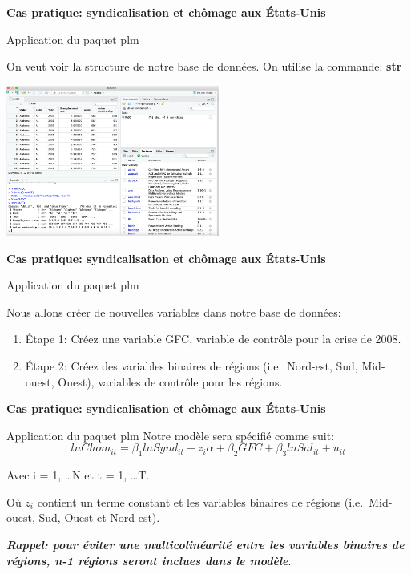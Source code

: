 \documentclass{beamer}
\begin{document}
\begin{frame}{\textbf{Cas pratique: syndicalisation et ch\^omage aux \'Etats-Unis}}
\begin{block}{Application du paquet plm}
\end{block}
On veut voir la structure de notre base de donn\'ees. On utilise la commande: \textbf{str}
\begin{center}
\includegraphics [width=7cm] {str.png} 
\end{center}
\end{frame}
\begin{frame}{\textbf{Cas pratique: syndicalisation et ch\^omage aux \'Etats-Unis}}
\begin{block}{Application du paquet plm}
\end{block}
Nous allons cr\'eer de nouvelles variables dans notre base de donn\'ees: 
\begin{enumerate}
\item  \'Etape 1: Cr\'eez une variable GFC, variable de contr\^ole pour la crise de 2008. 
\item  \'Etape 2: Cr\'eez des variables binaires de r\'egions (i.e.\ Nord-est, Sud, Mid-ouest, Ouest), variables de contr\^ole pour les r\'egions. 
\end{enumerate} 
\end{frame}
\begin{frame}{\textbf{Cas pratique: syndicalisation et ch\^omage aux \'Etats-Unis}}
\begin{block}{Application du paquet plm}
Notre  mod\`ele sera  sp\'ecifi\'e comme suit: 
   \begin{equation*}
lnChom_{it}= \beta_{1}lnSynd_{it}+ z_i \alpha +\beta_{2}GFC+\beta_{3}lnSal_{it}+u_{it}
    \end{equation*}
\end{block}
Avec i = 1, \ldots N et t = 1, \ldots T. \newline

O\`u $z_i $ contient un terme constant et les variables binaires de r\'egions (i.e.\ Mid-ouest, Sud, Ouest et Nord-est). \newline

\textbf{\textit{Rappel: pour \'eviter une multicolin\'earit\'e entre les variables binaires de r\'egions, n-1 r\'egions seront inclues dans le mod\`ele}}. 
\end{frame}
\end{document}
